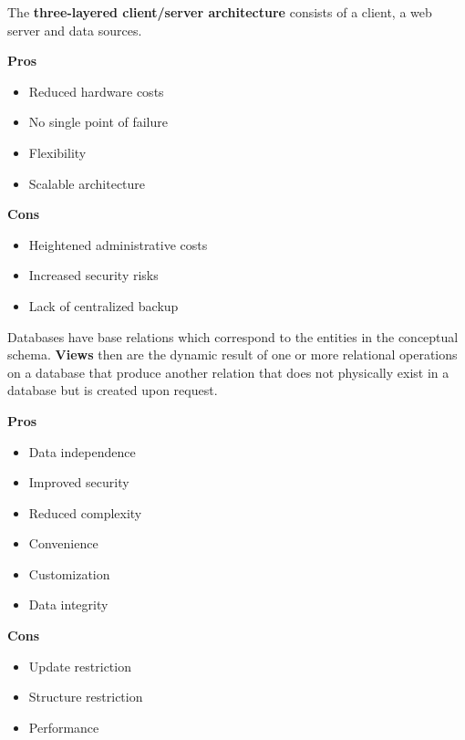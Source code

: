 The \textbf{three-layered client/server architecture} consists of a client, a web server and data sources.\\
\begin{minipage}[t]{0.49\textwidth}
    \textbf{Pros}
    \begin{itemize}[topsep=0pt,noitemsep]
      \item Reduced hardware costs
      \item No single point of failure
      \item Flexibility
      \item Scalable architecture
    \end{itemize}
\end{minipage}
\begin{minipage}[t]{0.49\textwidth}
    \textbf{Cons}
    \begin{itemize}[topsep=0pt, noitemsep]
      \item Heightened administrative costs
      \item Increased security risks
      \item Lack of centralized backup
    \end{itemize}
\end{minipage}
\vspace{20pt}

Databases have base relations which correspond to the entities in the conceptual schema.
\textbf{Views} then are the dynamic result of one or more relational operations on a database that produce another relation that does not physically exist in a database but is created upon request.\\
\begin{minipage}[t]{0.49\textwidth}
    \textbf{Pros}
    \begin{itemize}[topsep=0pt,noitemsep]
      \item Data independence
      \item Improved security
      \item Reduced complexity
      \item Convenience
      \item Customization
      \item Data integrity
    \end{itemize}
\end{minipage}
\begin{minipage}[t]{0.49\textwidth}
    \textbf{Cons}
    \begin{itemize}[topsep=0pt, noitemsep]
      \item Update restriction
      \item Structure restriction
      \item Performance
    \end{itemize}
\end{minipage}
\vspace{20pt}

